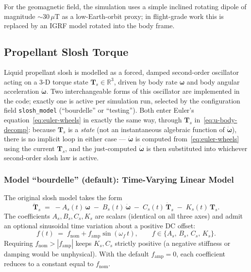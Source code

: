 For the geomagnetic field, the simulation uses a simple inclined rotating
dipole of magnitude $\sim\!30\,\mu\mathrm{T}$ as a low-Earth-orbit proxy;
in flight-grade work this is replaced by an IGRF model rotated into the
body frame.


\subsection{Propellant Slosh Torque}
\label{sec:slosh}

Liquid propellant slosh is modelled as a forced, damped second-order
oscillator acting on a 3-D torque state $\bm{T}_{\!s}\in\mathbb{R}^{3}$,
driven by body rate $\bm{\omega}$ and body angular acceleration
$\dot{\bm{\omega}}$. Two interchangeable forms of this oscillator are
implemented in the code; exactly one is active per simulation run,
selected by the configuration field \texttt{slosh\_model} (``bourdelle''
or ``testing''). Both enter Euler's equation~\eqref{eq:euler-wheels} in
exactly the same way, through $\bm{T}_{\!s}$
in~\eqref{eq:u-body-decomp}: because $\bm{T}_{\!s}$ is a \emph{state} (not
an instantaneous algebraic function of $\dot{\bm{\omega}}$), there is no
implicit loop in either case --- $\dot{\bm{\omega}}$ is computed
from~\eqref{eq:euler-wheels} using the current $\bm{T}_{\!s}$, and the
just-computed $\dot{\bm{\omega}}$ is then substituted into whichever
second-order slosh law is active.

\subsubsection{Model ``bourdelle'' (default): Time-Varying Linear Model}
\label{sec:slosh-bourdelle}

The original slosh model takes the form
\begin{equation}
\boxed{\;
\ddot{\bm{T}}_{\!s}
\;=\;
 -A_s(t)\,\bm{\omega}
 \;-\; B_s(t)\,\dot{\bm{\omega}}
 \;-\; C_s(t)\,\dot{\bm{T}}_{\!s}
 \;-\; K_s(t)\,\bm{T}_{\!s}.
\;}
\label{eq:slosh}
\end{equation}
The coefficients $A_s, B_s, C_s, K_s$ are scalars (identical on all three
axes) and admit an optional sinusoidal time variation about a positive
DC offset:
\begin{equation}
f(t) \;=\; f_{\text{nom}} + f_{\text{amp}}\sin(\omega_f\,t),
\qquad f \in \{A_s,\,B_s,\,C_s,\,K_s\}.
\label{eq:slosh-coeff}
\end{equation}
Requiring $f_{\text{nom}} > |f_{\text{amp}}|$ keeps $K_s,C_s$ strictly
positive (a negative stiffness or damping would be unphysical). With the
default $f_{\text{amp}} = 0$, each coefficient reduces to a constant equal
to $f_{\text{nom}}$.

